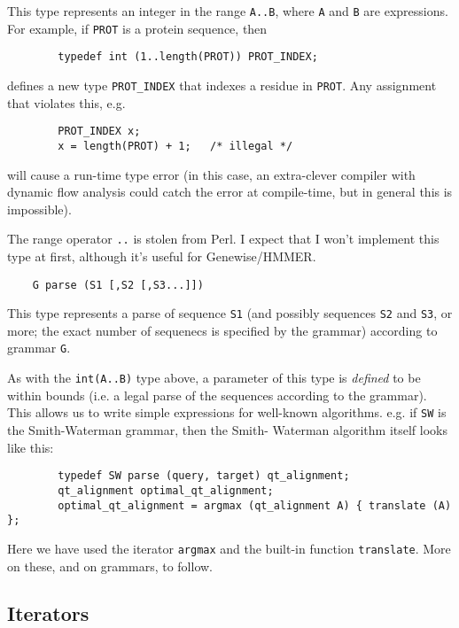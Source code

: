 \documentclass{article}
\begin{document}
This type represents an integer in the range {\tt A..B}, where {\tt A} and {\tt B} are
expressions. For example, if {\tt PROT} is a protein sequence, then

\begin{verbatim}
		typedef int (1..length(PROT)) PROT_INDEX;
\end{verbatim}

defines a new type {\tt PROT\_INDEX} that indexes a residue in {\tt PROT}. Any
assignment that violates this, e.g.

\begin{verbatim}
		PROT_INDEX x;
		x = length(PROT) + 1;   /* illegal */
\end{verbatim}

will cause a run-time type error (in this case, an extra-clever compiler
with dynamic flow analysis could catch the error at compile-time, but in
general this is impossible).

The range operator {\tt ..} is stolen from Perl. I expect that I won't
implement this type at first, although it's useful for Genewise/HMMER.

\begin{verbatim}
	G parse (S1 [,S2 [,S3...]])
\end{verbatim}

This type represents a parse of sequence {\tt S1} (and possibly sequences {\tt S2} and
{\tt S3}, or more; the exact number of sequenecs is specified by the grammar)
according to grammar {\tt G}.

As with the {\tt int(A..B)} type above, a parameter of this type is {\em defined} to
be within bounds (i.e. a legal parse of the sequences according to the
grammar). This allows us to write simple expressions for well-known
algorithms. e.g. if {\tt SW} is the Smith-Waterman grammar, then the Smith-
Waterman algorithm itself looks like this:

\begin{verbatim}
		typedef SW parse (query, target) qt_alignment;
		qt_alignment optimal_qt_alignment;
		optimal_qt_alignment = argmax (qt_alignment A) { translate (A) };
\end{verbatim}

Here we have used the iterator {\tt argmax} and the built-in function
{\tt translate}. More on these, and on grammars, to follow.


\subsection{Iterators}
\end{document}
